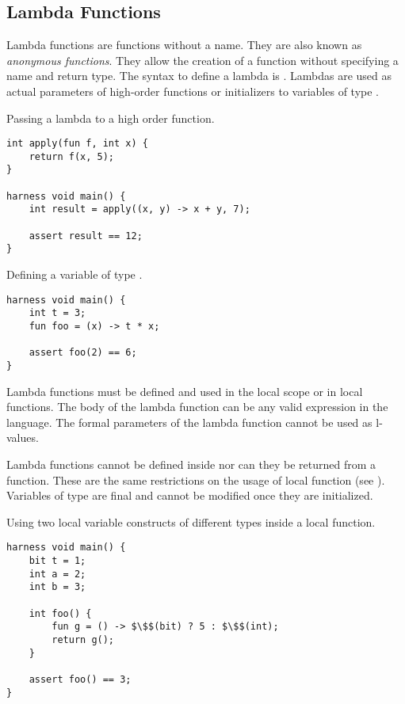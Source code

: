 \subsection{Lambda Functions}

Lambda functions are functions without a name. They are also known as \textit{anonymous functions}. They allow the creation of a function without specifying a name and return type. The syntax to define a lambda is . Lambdas are used as actual parameters of high-order functions or initializers to variables of type .

\begin{Example}
Passing a lambda to a high order function.
\begin{lstlisting}
int apply(fun f, int x) {
    return f(x, 5);
}

harness void main() {
    int result = apply((x, y) -> x + y, 7);

    assert result == 12;
}
\end{lstlisting}

\end{Example}

\begin{Example}
Defining a variable of type .
\begin{lstlisting}
harness void main() {
    int t = 3;
    fun foo = (x) -> t * x;

    assert foo(2) == 6;
}
\end{lstlisting}

\end{Example}

Lambda functions must be defined and used in the local scope or in local functions. The body of the lambda function can be any valid expression in the language. The formal parameters of the lambda function cannot be used as l-values.

Lambda functions cannot be defined inside  nor can they be returned from a function. These are the same restrictions on the usage of local function (see ). Variables of type  are final and cannot be modified once they are initialized.

\begin{Example}
Using two local variable constructs of different types inside a local function.
\begin{lstlisting}
harness void main() {
    bit t = 1;
    int a = 2;
    int b = 3;

    int foo() {
        fun g = () -> $\$$(bit) ? 5 : $\$$(int);
        return g();
    }

    assert foo() == 3;
}
\end{lstlisting}

\end{Example}


